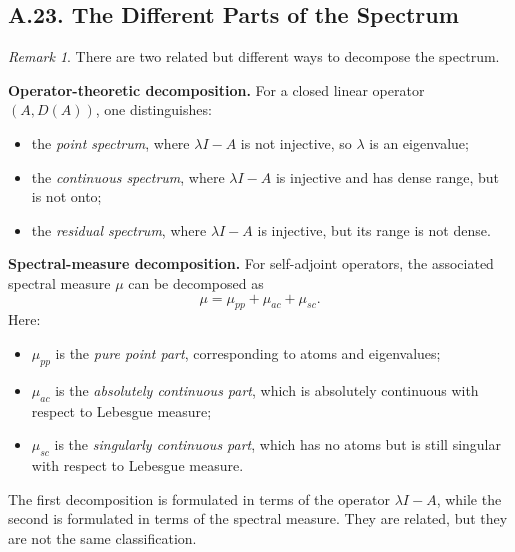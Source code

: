 \documentclass[11pt]{article}
\theoremstyle{definition}
\theoremstyle{remark}
\newtheorem{remark}{Remark}
\begin{document}
\subsection*{A.23. The Different Parts of the Spectrum}
\begin{remark}
There are two related but different ways to decompose the spectrum.

\textbf{Operator-theoretic decomposition.} For a closed linear operator \((A,D(A))\), one distinguishes:
\begin{itemize}
\item the \emph{point spectrum}, where \(\lambda I-A\) is not injective, so \(\lambda\) is an eigenvalue;
\item the \emph{continuous spectrum}, where \(\lambda I-A\) is injective and has dense range, but is not onto;
\item the \emph{residual spectrum}, where \(\lambda I-A\) is injective, but its range is not dense.
\end{itemize}

\textbf{Spectral-measure decomposition.} For self-adjoint operators, the associated spectral measure \(\mu\) can be decomposed as
\[
\mu=\mu_{pp}+\mu_{ac}+\mu_{sc}.
\]
Here:
\begin{itemize}
\item \(\mu_{pp}\) is the \emph{pure point part}, corresponding to atoms and eigenvalues;
\item \(\mu_{ac}\) is the \emph{absolutely continuous part}, which is absolutely continuous with respect to Lebesgue measure;
\item \(\mu_{sc}\) is the \emph{singularly continuous part}, which has no atoms but is still singular with respect to Lebesgue measure.
\end{itemize}

The first decomposition is formulated in terms of the operator \(\lambda I-A\), while the second is formulated in terms of the spectral measure. They are related, but they are not the same classification.
\end{remark}
\end{document}
